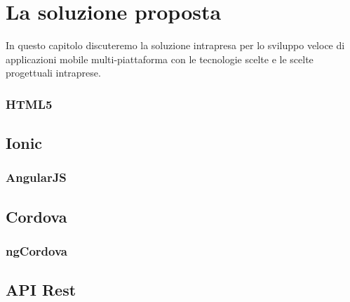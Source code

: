 \chapter{La soluzione proposta}
In questo capitolo discuteremo la soluzione intrapresa per lo sviluppo veloce di applicazioni mobile multi-piattaforma con le tecnologie scelte e le scelte progettuali intraprese. 
\subsection{HTML5}

\section{Ionic}

 

\subsection{AngularJS}
\section{Cordova}
\subsection{ngCordova}
\section{API Rest}
